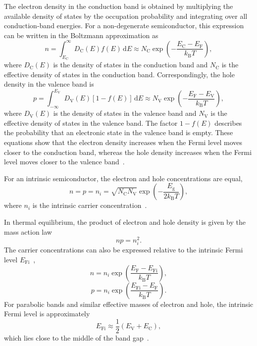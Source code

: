 The electron density in the conduction band is obtained by multiplying the
available density of states by the occupation probability and integrating over
all conduction-band energies. For a non-degenerate semiconductor, this expression
can be written in the Boltzmann approximation as~\cite{Neamen}
\begin{equation}
    n = \int_{E_\mathrm{C}}^{\infty} D_\mathrm{C}(E) f(E) \, \mathrm{d}E
    \approx N_\mathrm{C}
    \exp\left(-\frac{E_\mathrm{C}-E_\mathrm{F}}{k_\mathrm{B}T}\right),
\end{equation}
where $D_\mathrm{C}(E)$ is the density of states in the conduction band and
$N_\mathrm{C}$ is the effective density of states in the conduction band.
Correspondingly, the hole density in the valence band is
\begin{equation}
    p = \int_{-\infty}^{E_\mathrm{V}} D_\mathrm{V}(E) \left[1-f(E)\right]
    \, \mathrm{d}E
    \approx N_\mathrm{V}
    \exp\left(-\frac{E_\mathrm{F}-E_\mathrm{V}}{k_\mathrm{B}T}\right),
\end{equation}
where $D_\mathrm{V}(E)$ is the density of states in the valence band and
$N_\mathrm{V}$ is the effective density of states in the valence band. The factor
$1-f(E)$ describes the probability that an electronic state in the valence band
is empty. These equations show that the electron density increases when the
Fermi level moves closer to the conduction band, whereas the hole density
increases when the Fermi level moves closer to the valence band~\cite{Neamen}.

For an intrinsic semiconductor, the electron and hole concentrations are equal,
\begin{equation}
    n = p = n_i =\sqrt{N_\mathrm{C}N_\mathrm{V}}
    \exp\left(-\frac{E_\mathrm{g}}{2k_\mathrm{B}T}\right),
\end{equation}
where $n_i$ is the intrinsic carrier concentration~\cite{Neamen}.

In thermal equilibrium, the product of electron and hole density is given by the
mass action law~\cite{Neamen}
\begin{equation}
    np = n_i^2 .
\end{equation}
The carrier concentrations can also be expressed relative to the intrinsic
Fermi level $E_\mathrm{Fi}$~\cite{Neamen},
\begin{equation}
    n = n_i \exp\left(\frac{E_\mathrm{F}-E_\mathrm{Fi}}{k_\mathrm{B}T}\right),
\end{equation}
\begin{equation}
    p = n_i \exp\left(\frac{E_\mathrm{Fi}-E_\mathrm{F}}{k_\mathrm{B}T}\right).
\end{equation}
For parabolic bands and similar effective masses of electron and hole, the
intrinsic Fermi level is approximately
\begin{equation}
    E_\mathrm{Fi} \approx \frac{1}{2}\left(E_\mathrm{V}+E_\mathrm{C}\right),
\end{equation}
which lies close to the middle of the band gap~\cite{Neamen}.

